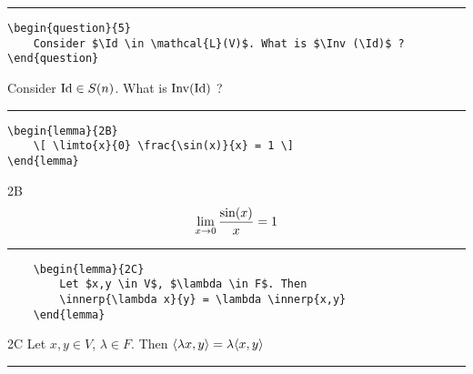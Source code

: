 \documentclass[12pt]{article}
\begin{document}
\noindent\rule{\textwidth}{1pt}

\begin{verbatim}
\begin{question}{5}
    Consider $\Id \in \mathcal{L}(V)$. What is $\Inv (\Id)$ ?
\end{question}
\end{verbatim}

\begin{question}{5}
    Consider $\operatorname{Id} \in S(n)$. What is $\operatorname{Inv} (\operatorname{Id})$ ?
\end{question}

\noindent\rule{\textwidth}{1pt}

\begin{verbatim}
\begin{lemma}{2B}
    \[ \limto{x}{0} \frac{\sin(x)}{x} = 1 \]
\end{lemma}
\end{verbatim}

\begin{lemma}{2B}
\[ \lim_{x \rightarrow 0} \frac{\sin(x)}{x} = 1 \]
\end{lemma}

\noindent\rule{\textwidth}{1pt}

\begin{verbatim}
    \begin{lemma}{2C} 
        Let $x,y \in V$, $\lambda \in F$. Then
        \innerp{\lambda x}{y} = \lambda \innerp{x,y}
    \end{lemma}
\end{verbatim}

\begin{lemma}{2C} 
    Let $x,y \in V$, $\lambda \in F$. Then
      $\langle \lambda x, y\rangle = \lambda \langle x, y\rangle$
\end{lemma}

\noindent\rule{\textwidth}{1pt}
\end{document}
